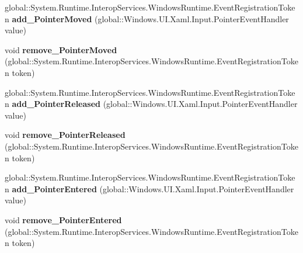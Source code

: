 \begin{DoxyCompactItemize}
\item 
\mbox{\label{interface_windows_1_1_u_i_1_1_xaml_1_1_i_u_i_element_a186c081f1e37b9989fc4ddd5820d840c}} 
global\+::\+System.\+Runtime.\+Interop\+Services.\+Windows\+Runtime.\+Event\+Registration\+Token {\bfseries add\+\_\+\+Pointer\+Moved} (global\+::\+Windows.\+U\+I.\+Xaml.\+Input.\+Pointer\+Event\+Handler value)
\item 
\mbox{\label{interface_windows_1_1_u_i_1_1_xaml_1_1_i_u_i_element_ad8d5295f79014845522686f6bf012501}} 
void {\bfseries remove\+\_\+\+Pointer\+Moved} (global\+::\+System.\+Runtime.\+Interop\+Services.\+Windows\+Runtime.\+Event\+Registration\+Token token)
\item 
\mbox{\label{interface_windows_1_1_u_i_1_1_xaml_1_1_i_u_i_element_ab3b709a6be4af0f8547f52d2157bd763}} 
global\+::\+System.\+Runtime.\+Interop\+Services.\+Windows\+Runtime.\+Event\+Registration\+Token {\bfseries add\+\_\+\+Pointer\+Released} (global\+::\+Windows.\+U\+I.\+Xaml.\+Input.\+Pointer\+Event\+Handler value)
\item 
\mbox{\label{interface_windows_1_1_u_i_1_1_xaml_1_1_i_u_i_element_abd23ebff773fb5a9158d2ee59097988e}} 
void {\bfseries remove\+\_\+\+Pointer\+Released} (global\+::\+System.\+Runtime.\+Interop\+Services.\+Windows\+Runtime.\+Event\+Registration\+Token token)
\item 
\mbox{\label{interface_windows_1_1_u_i_1_1_xaml_1_1_i_u_i_element_a54194f94b331caa84198af8f0147c1f1}} 
global\+::\+System.\+Runtime.\+Interop\+Services.\+Windows\+Runtime.\+Event\+Registration\+Token {\bfseries add\+\_\+\+Pointer\+Entered} (global\+::\+Windows.\+U\+I.\+Xaml.\+Input.\+Pointer\+Event\+Handler value)
\item 
\mbox{\label{interface_windows_1_1_u_i_1_1_xaml_1_1_i_u_i_element_a97fd59b642c8546d197cd5ffebe213bf}} 
void {\bfseries remove\+\_\+\+Pointer\+Entered} (global\+::\+System.\+Runtime.\+Interop\+Services.\+Windows\+Runtime.\+Event\+Registration\+Token token)
\item 

\end{DoxyCompactItemize}

